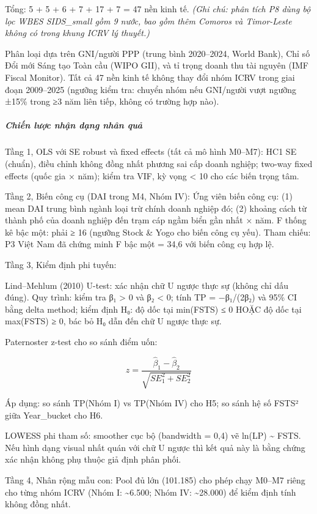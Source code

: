 \documentclass[12pt,a4paper]{article}
\begin{document}
Tổng: 5 + 5 + 6 + 7 + 17 + 7 = 47 nền kinh tế. \emph{(Ghi chú: phân tích
P8 dùng bộ lọc WBES SIDS\_small gồm 9 nước, bao gồm thêm Comoros và
Timor-Leste không có trong khung ICRV lý thuyết.)}

Phân loại dựa trên GNI/người PPP (trung bình 2020--2024, World Bank),
Chỉ số Đổi mới Sáng tạo Toàn cầu (WIPO GII), và tỉ trọng doanh thu tài
nguyên (IMF Fiscal Monitor). Tất cả 47 nền kinh tế không thay đổi nhóm
ICRV trong giai đoạn 2009--2025 (ngưỡng kiểm tra: chuyển nhóm nếu
GNI/người vượt ngưỡng ±15\% trong ≥3 năm liên tiếp, không có trường hợp
nào).

\hypertarget{chiux1ebfn-lux1b0ux1ee3c-nhux1eadn-dux1ea1ng-nhuxe2n-quux1ea3}{%
\subparagraph{Chiến lược nhận dạng nhân
quả}\label{chiux1ebfn-lux1b0ux1ee3c-nhux1eadn-dux1ea1ng-nhuxe2n-quux1ea3}}

Tầng 1, OLS với SE robust và fixed effects (tất cả mô hình M0--M7): HC1
SE (chuẩn), điều chỉnh không đồng nhất phương sai cấp doanh nghiệp;
two-way fixed effects (quốc gia × năm); kiểm tra VIF, kỳ vọng
\textless{} 10 cho các biến trọng tâm.

Tầng 2, Biến công cụ (DAI trong M4, Nhóm IV): Ứng viên biến công cụ: (1)
mean DAI trung bình ngành loại trừ chính doanh nghiệp đó; (2) khoảng
cách từ thành phố của doanh nghiệp đến trạm cáp ngầm biển gần nhất ×
năm. F thống kê bậc một: phải ≥ 16 (ngưỡng Stock \& Yogo cho biến công
cụ yếu). Tham chiếu: P3 Việt Nam đã chứng minh F bậc một = 34,6 với biến
công cụ hợp lệ.

Tầng 3, Kiểm định phi tuyến:

Lind--Mehlum (2010) U-test: xác nhận chữ U ngược thực sự (không chỉ dấu
đúng). Quy trình: kiểm tra β₁ \textgreater{} 0 và β₂ \textless{} 0; tính
TP = −β₁/(2β₂) và 95\% CI bằng delta method; kiểm định H₀: độ dốc tại
min(FSTS) ≤ 0 HOẶC độ dốc tại max(FSTS) ≥ 0, bác bỏ H₀ dẫn đến chữ U
ngược thực sự.

Paternoster z-test cho so sánh điểm uốn:

\[z = \frac{\hat{\beta}_1 - \hat{\beta}_2}{\sqrt{SE_1^2 + SE_2^2}}\]

Áp dụng: so sánh TP(Nhóm I) vs TP(Nhóm IV) cho H5; so sánh hệ số FSTS²
giữa Year\_bucket cho H6.

LOWESS phi tham số: smoother cục bộ (bandwidth = 0,4) vẽ ln(LP)
\textasciitilde{} FSTS. Nếu hình dạng visual nhất quán với chữ U ngược
thì kết quả này là bằng chứng xác nhận không phụ thuộc giả định phân
phối.

Tầng 4, Nhân rộng mẫu con: Pool đủ lớn (101.185) cho phép chạy M0--M7
riêng cho từng nhóm ICRV (Nhóm I: \textasciitilde6.500; Nhóm IV:
\textasciitilde28.000) để kiểm định tính không đồng nhất.
\end{document}
